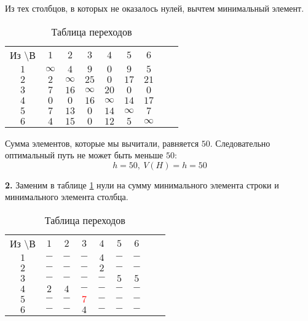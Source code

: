 Из тех столбцов, в которых не оказалось нулей, вычтем минимальный элемент.

\begin{table}[H]
\begin{center}
	\def\tabcolsep{15pt}
	\caption{Таблица переходов}
	\label{tab:4}
	\begin{tabular}{|c||c|c|c|c|c|c|c|c|}
		\hline
		Из \textbackslash В & $1$ & $2$ & $3$ & $4$ & $5$ & $6$ \\
		\hhline{|=#=|=|=|=|=|=|}
		$1$ & $\infty$ & $4$ & $9$ & $0$ & $9$ & $5$ \\
		\hline
		$2$ & $2$ & $\infty$ & $25$ & $0$ & $17$ & $21$ \\
		\hline
		$3$ & $7$ & $16$ & $\infty$ & $20$ & $0$ & $0$ \\ 
		\hline
		$4$ & $0$ & $0$ & $16$ & $\infty$ & $14$ & $17$ \\
		\hline
		$5$ & $7$ & $13$ & $0$ & $14$ & $\infty$ & $7$ \\
		\hline
		$6$ & $4$ & $15$ & $0$ & $12$ & $5$ & $\infty$ \\ 
		\hline
	\end{tabular}
\end{center}
\end{table}

Сумма элементов, которые мы вычитали, равняется $50$. Следовательно оптимальный путь не может быть меньше $50$:
\begin{equation*}
	h = 50,\ V(H) = h = 50
\end{equation*}

\textbf{2.} Заменим в таблице \ref{tab:4} нули на сумму минимального элемента строки и минимального элемента столбца.

\begin{table}[H]
\begin{center}
	\def\tabcolsep{15pt}
	\caption{Таблица переходов}
	\label{tab:5}
	\begin{tabular}{|c||c|c|c|c|c|c|c|c|}
		\hline
		Из \textbackslash В & $1$ & $2$ & $3$ & $4$ & $5$ & $6$ \\
		\hhline{|=#=|=|=|=|=|=|}
		$1$ & $-$ & $-$ & $-$ & $4$ & $-$ & $-$ \\
		\hline
		$2$ & $-$ & $-$ & $-$ & $2$ & $-$ & $-$ \\
		\hline
		$3$ & $-$ & $-$ & $-$ & $-$ & $5$ & $5$ \\ 
		\hline
		$4$ & $2$ & $4$ & $-$ & $-$ & $-$ & $-$ \\
		\hline
		$5$ & $-$ & $-$ & \textcolor{red}{\boldmath$7$} & $-$ & $-$ & $-$ \\
		\hline
		$6$ & $-$ & $-$ & $4$ & $-$ & $-$ & $-$ \\ 
		\hline
	\end{tabular}
\end{center}
\end{table}

